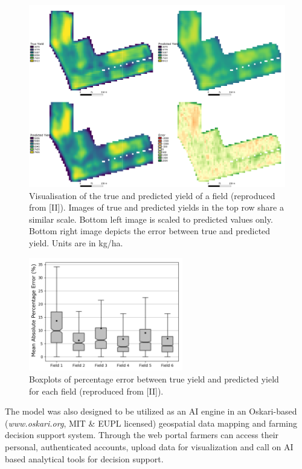 \begin{figure}[htb]
    \centering
    \includegraphics[width = \textwidth]{images/ii-FigurePallette.png}
    \caption{Visualisation of the true and predicted yield of a field (reproduced from [II]). Images of true and predicted yields in the top row share a similar scale. Bottom left image is scaled to predicted values only. Bottom right image depicts the error between true and predicted yield. Units are in kg/ha.}
    \label{fig:ii-FigurePallette}
\end{figure}

\begin{figure}[htb]
    \centering
    \includegraphics[width = 0.6\textwidth]{images/ii-MAPE_boxplots.png}
    \caption{Boxplots of percentage error between true yield and predicted yield for each field (reproduced from [II]).}
    \label{fig:ii-boxplots}
\end{figure}

The model was also designed to be utilized as an AI engine in an Oskari-based (\emph{www.oskari.org}, MIT \& EUPL licensed) geospatial data mapping and farming decision support system. Through the web portal farmers can access their personal, authenticated accounts, upload data for visualization and call on AI based analytical tools for decision support.

